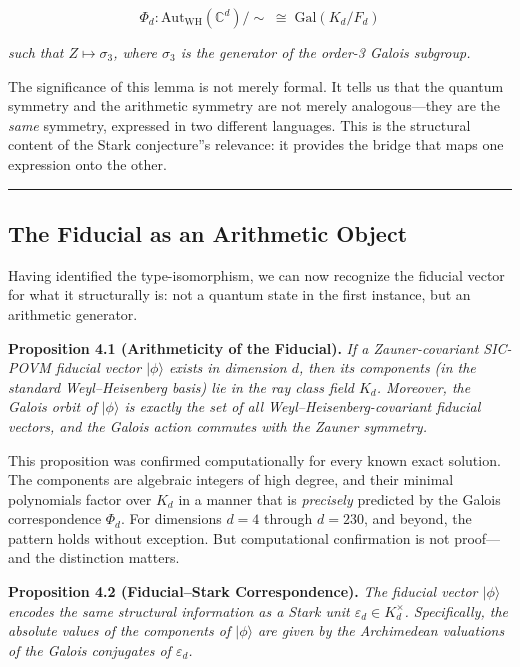 \documentclass[12pt,a4paper]{article}
\begin{document}
\[\Phi_d : \text{Aut}_{\text{WH}}(\mathbb{C}^d) / \sim \;\cong\; \text{Gal}(K_d / F_d)\]

\emph{such that $Z \mapsto \sigma_3$, where $\sigma_3$ is the generator of the order-3 Galois subgroup.}

The significance of this lemma is not merely formal. It tells us that the quantum symmetry and the arithmetic symmetry are not merely analogous---they are the \emph{same} symmetry, expressed in two different languages. This is the structural content of the Stark conjecture''s relevance: it provides the bridge that maps one expression onto the other.

\begin{center}
\rule{0.5\textwidth}{0.4pt}
\end{center}

\subsection{The Fiducial as an Arithmetic Object}

Having identified the type-isomorphism, we can now recognize the fiducial vector for what it structurally is: not a quantum state in the first instance, but an arithmetic generator.

\textbf{Proposition 4.1 (Arithmeticity of the Fiducial).} \emph{If a Zauner-covariant SIC-POVM fiducial vector $|\phi\rangle$ exists in dimension $d$, then its components (in the standard Weyl--Heisenberg basis) lie in the ray class field $K_d$. Moreover, the Galois orbit of $|\phi\rangle$ is exactly the set of all Weyl--Heisenberg-covariant fiducial vectors, and the Galois action commutes with the Zauner symmetry.}

This proposition was confirmed computationally for every known exact solution. The components are algebraic integers of high degree, and their minimal polynomials factor over $K_d$ in a manner that is \emph{precisely} predicted by the Galois correspondence $\Phi_d$. For dimensions $d = 4$ through $d = 230$, and beyond, the pattern holds without exception. But computational confirmation is not proof---and the distinction matters.

\textbf{Proposition 4.2 (Fiducial--Stark Correspondence).} \emph{The fiducial vector $|\phi\rangle$ encodes the same structural information as a Stark unit $\varepsilon_d \in K_d^\times$. Specifically, the absolute values of the components of $|\phi\rangle$ are given by the Archimedean valuations of the Galois conjugates of $\varepsilon_d$.}
\end{document}

